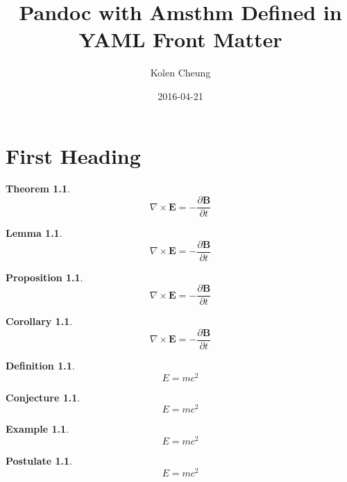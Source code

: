 \documentclass[english,oneside, article]{memoir}
\title{Pandoc with Amsthm Defined in YAML Front Matter}
\author{Kolen Cheung}
\date{2016-04-21}
\theoremstyle{plain}
\newtheorem{Theorem}{Theorem}[chapter]
\newtheorem*{Lemma}{Lemma}
\newtheorem*{Proposition}{Proposition}
\newtheorem*{Corollary}{Corollary}
\theoremstyle{definition}
\newtheorem{Definition}{Definition}[chapter]
\newtheorem{Conjecture}{Conjecture}[chapter]
\newtheorem{Example}{Example}[chapter]
\newtheorem{Postulate}{Postulate}[chapter]
\theoremstyle{remark}
\begin{document}
\maketitle

{
\hypersetup{linkcolor=black}
\setcounter{tocdepth}{5}
\tableofcontents
}
\chapter{First Heading}\label{first-heading}

\begin{Theorem}

\[\nabla \times \mathbf{E} = - \frac{\partial \mathbf{B}}{\partial t}\]

\end{Theorem}

\begin{Lemma}

\[\nabla \times \mathbf{E} = - \frac{\partial \mathbf{B}}{\partial t}\]

\end{Lemma}

\begin{Proposition}

\[\nabla \times \mathbf{E} = - \frac{\partial \mathbf{B}}{\partial t}\]

\end{Proposition}

\begin{Corollary}

\[\nabla \times \mathbf{E} = - \frac{\partial \mathbf{B}}{\partial t}\]

\end{Corollary}

\begin{Definition}

\[E=mc^2\]

\end{Definition}

\begin{Conjecture}

\[E=mc^2\]

\end{Conjecture}

\begin{Example}

\[E=mc^2\]

\end{Example}

\begin{Postulate}

\[E=mc^2\]

\end{Postulate}
\end{document}
